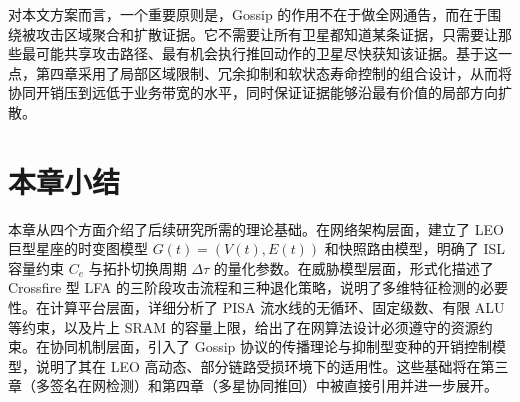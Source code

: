 对本文方案而言，一个重要原则是，Gossip 的作用不在于做全网通告，而在于围绕被攻击区域聚合和扩散证据。它不需要让所有卫星都知道某条证据，只需要让那些最可能共享攻击路径、最有机会执行推回动作的卫星尽快获知该证据。基于这一点，第四章采用了局部区域限制、冗余抑制和软状态寿命控制的组合设计，从而将协同开销压到远低于业务带宽的水平，同时保证证据能够沿最有价值的局部方向扩散。


\section{本章小结}

本章从四个方面介绍了后续研究所需的理论基础。在网络架构层面，建立了 LEO 巨型星座的时变图模型 $G(t)=(V(t), E(t))$ 和快照路由模型，明确了 ISL 容量约束 $C_e$ 与拓扑切换周期 $\Delta\tau$ 的量化参数。在威胁模型层面，形式化描述了 Crossfire 型 LFA 的三阶段攻击流程和三种退化策略，说明了多维特征检测的必要性。在计算平台层面，详细分析了 PISA 流水线的无循环、固定级数、有限 ALU 等约束，以及片上 SRAM 的容量上限，给出了在网算法设计必须遵守的资源约束。在协同机制层面，引入了 Gossip 协议的传播理论与抑制型变种的开销控制模型，说明了其在 LEO 高动态、部分链路受损环境下的适用性。这些基础将在第三章（多签名在网检测）和第四章（多星协同推回）中被直接引用并进一步展开。
